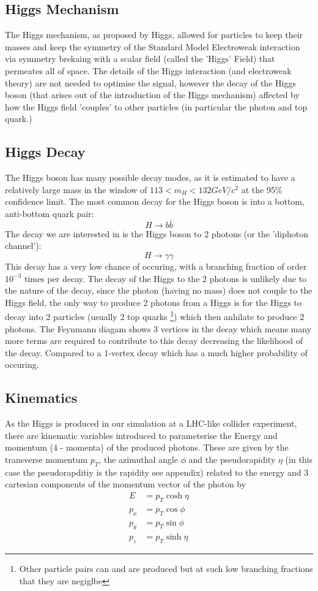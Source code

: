 \documentclass{article}
\begin{document}
\subsection{Higgs Mechanism}
The Higgs mechanism, as proposed by Higgs, allowed for particles to keep their masses and keep the symmetry of the Standard Model Electroweak interaction via symmetry brekaing with a scalar field (called the 'Higgs' Field) that permeates all of space. The details of the Higgs interaction (and electroweak theory) are not needed to optimise the signal, however the decay of the Higgs boson (that arises out of the introduction of the Higgs mechanism) affected by how the Higgs field 'couples' to other particles (in particular the photon and top quark.)\subsection{Higgs Decay}
The Higgs boson has many possible decay modes, as it is estimated to have a relatively large mass in the window of $113 < m_H < 132 GeV/c^2$ at the 95\% confidence limit. The most common decay for the Higgs boson is into a bottom, anti-bottom quark pair:
\begin{equation}
H \rightarrow b \bar{b}
\end{equation}
The decay we are interested in is the Higgs boson to 2 photons (or the 'diphoton channel'):
\begin{equation}
H \rightarrow \gamma \gamma
\end{equation}
\cite{HiggsdecayEMback}
This decay has a very low chance of occuring, with a branching fraction of order $10^{-3}$ times per decay. The decay of the Higgs to the 2 photons is unlikely due to the nature of the decay, since the photon (having no mass) does not couple to the Higgs field, the only way to produce 2 photons from a Higgs is for the Higgs to decay into 2 particles (usually 2 top quarks \footnote{Other particle pairs can and are produced but at such low branching fractions that they are negiglbe}) which then anhilate to produce 2 photons. The Feynmann diagam shows 3 vertices in the decay which means many more terms are required to contribute to this decay decreasing the likelihood of the decay. Compared to a 1-vertex decay which has a much higher probability of occuring. 
\subsection{Kinematics}
As the Higgs is produced in our simulation at a LHC-like collider experiment, there are kinematic variables introduced to parameterise the Energy and momentum (4 - momenta) of the produced photons. These are given by the transverse momentum $p_T$, the azimuthal angle $\phi$ and the pseudorapidity $\eta$ (in this case the pseudorapditiy is the rapidity see appendix) related to the energy and 3 cartesian components of the momentum vector of the photon by
\begin{align}
E &= p_T \cosh {\eta} \\
p_x &= p_T \cos{\phi} \\
p_y &= p_T \sin{\phi} \\
p_z &= p_T \sinh{\eta}
\end{align}
\end{document}
